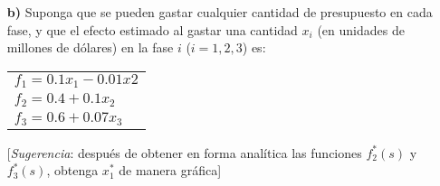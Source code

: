 \documentclass[twoside]{article}
\begin{document}
\begin{ejercicio}{1}
\begin{itemize}
\item[\textbf{b)}] Suponga que se pueden gastar cualquier cantidad de presupuesto en cada fase, y que el efecto estimado al gastar una cantidad $x_i$ (en unidades de millones de dólares) en la fase $i$ ($i=1,2,3$) es:

\begin{tabular}{l}
$f_1=0.1x_1-0.01x2$\\
$f_2=0.4+0.1x_2$\\
$f_3=0.6+0.07x_3$
\end{tabular}

[\emph{Sugerencia}: después de obtener en forma analítica las funciones $f_2^*(s)$ y $f_3^*(s)$, obtenga $x_1^*$ de manera gráfica]
\end{itemize}
\end{ejercicio}
\begin{solucion}


\end{solucion}

\newpage
\end{document}
